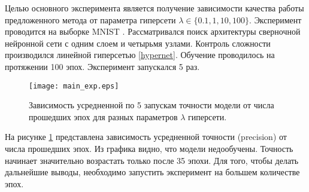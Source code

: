 \documentclass[12pt, twoside]{article}
\begin{document}
Целью основного эксперимента является получение зависимости качества работы предложенного метода от параметра гиперсети $\lambda \in \{0.1, 1, 10, 100\}$. Эксперимент проводится на выборке MNIST \cite{lecun-mnisthandwrittendigit-2010}. Рассматривался поиск архитектуры сверночной нейронной сети с одним слоем и четырьмя узлами. Контроль сложности производился линейной гиперсетью \ref{hypernet}. Обучение проводилось на протяжении 100 эпох. Эксперимент запускался 5 раз. 

\begin{figure}[H]
\centering
  \texttt{[image: main\_exp.eps]}
  \caption{Зависимость усредненной по 5 запускам точности модели от числа прошедших эпох для разных параметров $\lambda$ гиперсети.}
  \label{fig:main_exp}
\end{figure}

На рисунке \ref{fig:main_exp} представлена зависимость усредненной точности (precision) от числа прошедших эпох. Из графика видно, что модели недообучены. Точность начинает значительно возрастать только после 35 эпохи. Для того, чтобы делать дальнейшие выводы, необходимо запустить эксперимент на большем количестве эпох.
 

\newpage

\end{document}
